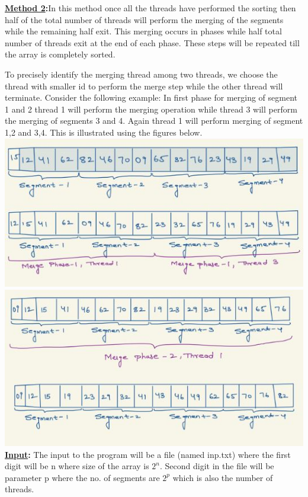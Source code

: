 \documentclass{article}
\begin{document}
\noindent\textbf{\underline {Method 2}:}In this method once all the threads have performed the sorting then half of the total number of threads will perform the merging of the segments while the remaining half exit. This merging occurs in phases while half total number of threads exit at the end of each phase. These steps will be repeated till the array is completely sorted. 

To precisely identify the merging thread among two threads, we choose the thread with smaller id to perform the merge step while the other thread will terminate. Consider the following example: In first phase for merging of segment 1 and 2 thread 1 will perform the merging operation while thread 3 will perform the merging of segments 3 and 4. Again thread 1 will perform merging of segment 1,2 and 3,4. This is illustrated using the figures below. \\ 



\includegraphics[width=\textwidth]{M-2,IMg1.JPG}
\includegraphics[width=\textwidth]{M-2,img2.JPG}\\
\noindent\textbf{\underline {Input}: } The input to the program will be a file (named inp.txt) where the first digit will be n where size of the array is $2^n$. Second digit in the file will be parameter p where the no. of segments are $2^p$ which is also the number of threads. \\
\end{document}

